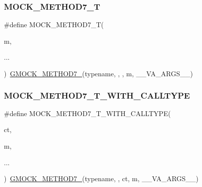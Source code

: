\mbox{\label{googletest-master_2googlemock_2include_2gmock_2gmock-generated-function-mockers_8h_a31bdd1d1448052f4122ecebf937a8f44}} 
\subsubsection{\texorpdfstring{MOCK\_METHOD7\_T}{MOCK\_METHOD7\_T}}
{\footnotesize\ttfamily \#define M\+O\+C\+K\+\_\+\+M\+E\+T\+H\+O\+D7\+\_\+T(\begin{DoxyParamCaption}\item[{}]{m,  }\item[{}]{... }\end{DoxyParamCaption})~\mbox{\hyperlink{_obj__test_2lib_2googletest-release-1_88_81_2googlemock_2include_2gmock_2gmock-generated-function-mockers_8h_ab98a8399ba62b53b375c2807f4d39d2f}{G\+M\+O\+C\+K\+\_\+\+M\+E\+T\+H\+O\+D7\+\_\+}}(typename, , , m, \+\_\+\+\_\+\+V\+A\+\_\+\+A\+R\+G\+S\+\_\+\+\_\+)}

\mbox{\label{googletest-master_2googlemock_2include_2gmock_2gmock-generated-function-mockers_8h_ae820565d836fda34401e8bdcfaaa7605}} 
\subsubsection{\texorpdfstring{MOCK\_METHOD7\_T\_WITH\_CALLTYPE}{MOCK\_METHOD7\_T\_WITH\_CALLTYPE}}
{\footnotesize\ttfamily \#define M\+O\+C\+K\+\_\+\+M\+E\+T\+H\+O\+D7\+\_\+\+T\+\_\+\+W\+I\+T\+H\+\_\+\+C\+A\+L\+L\+T\+Y\+PE(\begin{DoxyParamCaption}\item[{}]{ct,  }\item[{}]{m,  }\item[{}]{... }\end{DoxyParamCaption})~\mbox{\hyperlink{_obj__test_2lib_2googletest-release-1_88_81_2googlemock_2include_2gmock_2gmock-generated-function-mockers_8h_ab98a8399ba62b53b375c2807f4d39d2f}{G\+M\+O\+C\+K\+\_\+\+M\+E\+T\+H\+O\+D7\+\_\+}}(typename, , ct, m, \+\_\+\+\_\+\+V\+A\+\_\+\+A\+R\+G\+S\+\_\+\+\_\+)}

